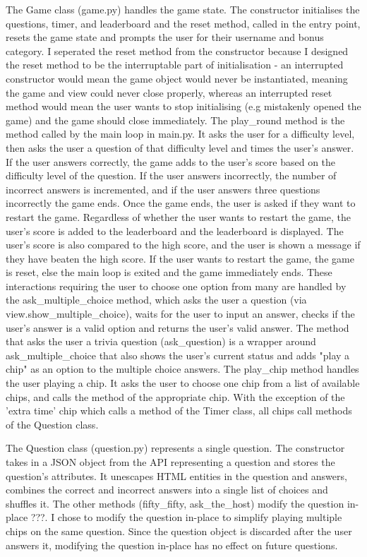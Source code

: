 \documentclass[12pt]{article}
\begin{document}
The Game class (game.py) handles the game state. 
The constructor initialises the questions, timer, and leaderboard and the reset method, called in the entry point, resets the game state and prompts the user for their username and bonus category. I seperated the reset method from the constructor because I designed the reset method to be the interruptable part of initialisation - an interrupted constructor would mean the game object would never be instantiated, meaning the game and view could never close properly, whereas an interrupted reset method would mean the user wants to stop initialising (e.g mistakenly opened the game) and the game should close immediately. 
The play\_round method is the method called by the main loop in main.py. It asks the user for a difficulty level, then asks the user a question of that difficulty level and times the user's answer. If the user answers correctly, the game adds to the user's score based on the difficulty level of the question. If the user answers incorrectly, the number of incorrect answers is incremented, and if the user answers three questions incorrectly the game ends.
Once the game ends, the user is asked if they want to restart the game. Regardless of whether the user wants to restart the game, the user's score is added to the leaderboard and the leaderboard is displayed. The user's score is also compared to the high score, and the user is shown a message if they have beaten the high score. If the user wants to restart the game, the game is reset, else the main loop is exited and the game immediately ends.
These interactions requiring the user to choose one option from many are handled by the ask\_multiple\_choice method, which asks the user a question (via view.show\_multiple\_choice), waits for the user to input an answer, checks if the user's answer is a valid option and returns the user's valid answer. The method that asks the user a trivia question (ask\_question) is a wrapper around ask\_multiple\_choice that also shows the user's current status and adds "play a chip" as an option to the multiple choice answers.
The play\_chip method handles the user playing a chip. It asks the user to choose one chip from a list of available chips, and calls the method of the appropriate chip. With the exception of the 'extra time' chip which calls a method of the Timer class, all chips call methods of the Question class.

The Question class (question.py) represents a single question.
The constructor takes in a JSON object from the API representing a question and stores the question's attributes. It unescapes HTML entities in the question and answers, combines the correct and incorrect answers into a single list of choices and shuffles it.
The other methods (fifty\_fifty, ask\_the\_host) modify the question in-place ???. I chose to modify the question in-place to simplify playing multiple chips on the same question. Since the question object is discarded after the user answers it, modifying the question in-place has no effect on future questions.
\end{document}
